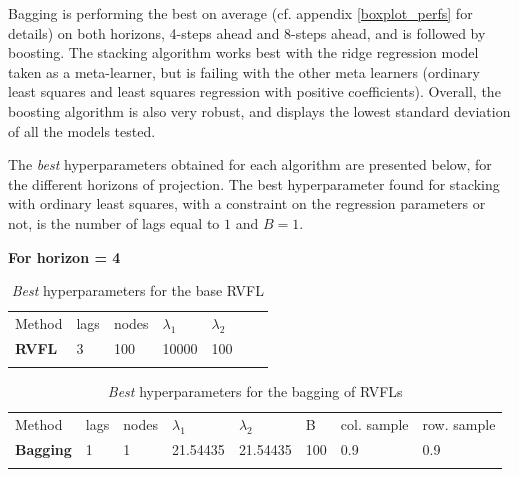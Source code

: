 Bagging is performing the best on average (cf. appendix \ref{boxplot_perfs} for details) on both horizons, 4-steps ahead and 8-steps ahead, and is followed by boosting. The stacking algorithm works best with the ridge regression model taken as a meta-learner, but is failing with the other meta learners (ordinary least squares and least squares regression with positive coefficients). Overall, the boosting algorithm is also very robust, and displays the lowest standard deviation of all the models tested.

The \textit{best} hyperparameters obtained for each algorithm are presented below, for the different horizons of projection. The best hyperparameter found for stacking with ordinary least squares, with a constraint on the regression parameters or not, is the number of lags equal to $1$ and $B = 1$.

\textbf{For horizon = 4}

\begin{table}[!htb]
\begin{center}
\caption{\textit{Best} hyperparameters for the base RVFL}
\label{tab:bestparamsrvfl}       %
\begin{tabular}{lllllll}
\hline\noalign{\smallskip}
Method & lags & nodes & $\lambda_1$ & $\lambda_2$ &   &   \\
\noalign{\smallskip}\hline\noalign{\smallskip}
  \textbf{RVFL} & 3 & 100 & 10000 & 100 &  &  \\
\noalign{\smallskip}\hline
\end{tabular}
\end{center}
\end{table}

\begin{table}[!htb]
\begin{center}
\caption{\textit{Best} hyperparameters for the bagging of RVFLs}
\label{tab:bestparamsbagrvfl}       %
\begin{tabular}{llllllll}
\hline\noalign{\smallskip}
Method & lags & nodes & $\lambda_1$ & $\lambda_2$ & B  &  col. sample  & row. sample\\
\noalign{\smallskip}\hline\noalign{\smallskip}
  \textbf{Bagging} & 1 & 1 & 21.54435 & 21.54435 & 100 & 0.9 & 0.9\\
\noalign{\smallskip}\hline
\end{tabular}
\end{center}
\end{table}

